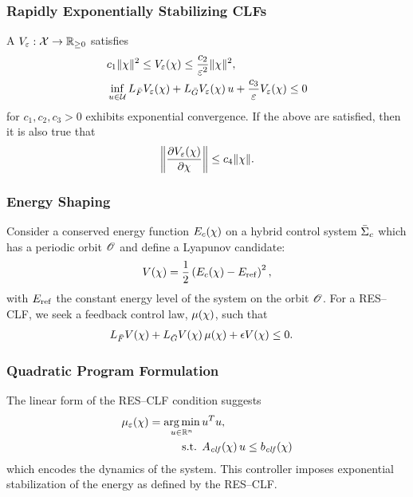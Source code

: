 \begin{frame}[t]
  \frametitle{Rapidly Exponentially Stabilizing CLFs}
  A 
  $V_{\varepsilon} : \mathcal{X} \to \mathbb{R}_{\geq 0}$ satisfies
  \begin{align*}
    &c_{1} \|\chi\|^{2} \leq V_{\varepsilon}(\chi) \leq \frac{c_{2}}{\varepsilon^{2}} \|\chi\|^{2},\\
    &\inf_{u \in \mathcal{U}} L_{{\bar {F}}}V_{\varepsilon}(\chi) + L_{{\bar {G}}}V_{\varepsilon}(\chi) \, u +
    \frac{c_{3}}{\varepsilon} V_{\varepsilon}(\chi) \leq 0
  \end{align*}
  for $c_{1}, c_{2}, c_{3} > 0$ exhibits exponential convergence. If the above
  are satisfied, then it is also true that
  \begin{align*}
    \left\| \frac{\partial{\ensuremath{V}_{\varepsilon}(\chi)}}{\partial{\chi}} \right\| \leq c_{4} \|\chi\|.
  \end{align*}
\end{frame}

\begin{frame}[t]
  \frametitle{Energy Shaping}
  Consider a conserved energy function $E_{c}(\chi)$ on a hybrid control system
  $\bar{\Sigma}_{c}$ which has a periodic orbit $\mathscr O$ and define a Lyapunov candidate:
  \begin{align*}
    V(\chi) = \frac{1}{2} \left(E_{c}(\chi) - E_{\mathrm{ref}}\right)^{2},
  \end{align*}
  with $E_{\mathrm{ref}}$ the constant energy level of the system on the orbit
  $\mathscr O$. For a RES--CLF, we seek a feedback control law, $\mu(\chi)$, such that
  \begin{align*}
    L_{{\bar {F}}} V(\chi) + L_{{\bar {G}}} V(\chi) \, \mu(\chi) + \epsilon V(\chi) &\leq 0.
  \end{align*}
\end{frame}

\begin{frame}[t]
  \frametitle{Quadratic Program Formulation}
  The linear form of the RES--CLF condition suggests
  \begin{align}
    \nonumber
    \mu_{\varepsilon}(\chi) = \operatorname*{arg\,min}_{u \in \mathbb{R}^{n}}  \, & u^T u,\\
    \mbox{s.t. } & A_{\mathit{clf}}(\chi) \, u \leq b_{\mathit{clf}}(\chi)
  \end{align}
  which encodes the dynamics of the system. This controller imposes exponential
  stabilization of the energy as defined by the RES--CLF.
\end{frame}

